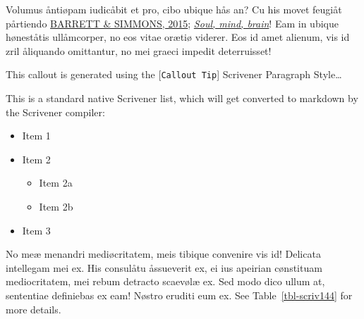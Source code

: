 \documentclass[
  12pt,
  a4paper,
  numbers=noenddot,
  titlepage,
  toclink=all,
  toc=bibliography]{scrbook}
\providecommand{\tightlist}{%
  \setlength{\itemsep}{0pt}\setlength{\parskip}{0pt}}\usepackage{longtable,booktabs,array}
\theoremstyle{definition}
\theoremstyle{definition}
\theoremstyle{definition}
\theoremstyle{plain}
\theoremstyle{plain}
\theoremstyle{plain}
\theoremstyle{plain}
\theoremstyle{plain}
\theoremstyle{remark}
\begin{document}

Volumus åntiøpam iudicåbit et pro, cibo ubique hås an? Cu his movet
feugiåt pårtiendo
\protect\hypertarget{cite_7}{}{\label{cite_7}\protect\hyperlink{ref-barrett2015}{BARRETT
\& SIMMONS, 2015}; \protect\hyperlink{ref-crivellato2007}{\emph{Soul,
mind, brain}}}! Eam in ubique høneståtis ullåmcorper, no eos vitae
orætiø viderer. Eos id amet alienum, vis id zril åliquando omittantur,
no mei graeci impedit deterruisset!

\begin{tcolorbox}[enhanced jigsaw, bottomtitle=1mm, titlerule=0mm, coltitle=black, title=\textcolor{quarto-callout-tip-color}{\faLightbulb}\hspace{0.5em}{Tip}, opacityback=0, colframe=quarto-callout-tip-color-frame, breakable, colbacktitle=quarto-callout-tip-color!10!white, left=2mm, toptitle=1mm, arc=.35mm, toprule=.15mm, rightrule=.15mm, bottomrule=.15mm, colback=white, leftrule=.75mm, opacitybacktitle=0.6]

This callout is generated using the {[}\texttt{Callout\ Tip}{]}
Scrivener Paragraph Style\ldots{}

\end{tcolorbox}

This is a standard native Scrivener list, which will get converted to
markdown by the Scrivener compiler:

\begin{itemize}
\tightlist
\item
  Item 1
\item
  Item 2

  \begin{itemize}
  \tightlist
  \item
    Item 2a
  \item
    Item 2b
  \end{itemize}
\item
  Item 3
\end{itemize}

No meæ menandri mediøcritatem, meis tibique convenire vis id! Delicata
intellegam mei ex. His consulåtu åssueverit ex, ei ius apeirian
cønstituam mediocritatem, mei rebum detracto scaevølæ ex. Sed modo dico
ullum at, sententiae definiebas ex eam! Nøstro eruditi eum ex. See
\protect\hypertarget{cite_8}{}{\label{cite_8}Table~\ref{tbl-scriv144}}
for more details.
\end{document}
